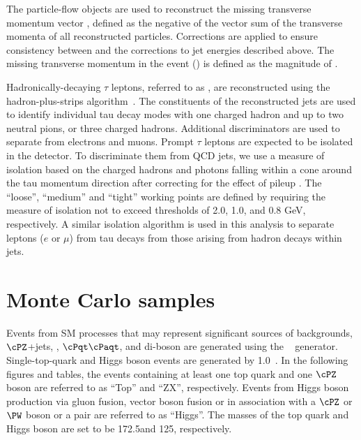 The particle-flow objects are used to reconstruct the missing transverse momentum  vector \ptvecmiss, defined as the negative of the vector sum of the transverse momenta of all reconstructed particles.  Corrections are applied to ensure consistency between
\ptvecmiss and the corrections to jet energies described above.  The missing transverse momentum in the event (\MPT) is defined as the magnitude of \ptvecmiss.

Hadronically-decaying $\tau$ leptons, referred to as \Tau, are reconstructed using the hadron-plus-strips algorithm~\cite{Khachatryan:2015dfa}.
The constituents of the reconstructed jets are used to identify individual tau decay modes with one charged 
hadron and up to two neutral pions, or three charged hadrons. 
Additional discriminators are used to separate \Tau from electrons and muons.
Prompt $\tau$ leptons are expected to be isolated in the detector.
To discriminate them from QCD jets, we use a measure of isolation 
based on the charged hadrons and photons falling within 
a cone around the tau momentum direction after correcting for the effect of
pileup \cite{Khachatryan:2014wca}. The ``loose'', ``medium'' and ``tight'' working points are defined
by requiring the measure of isolation not to exceed thresholds of 2.0, 1.0,
and 0.8 GeV, respectively.
 A similar isolation algorithm is 
used in this analysis to separate leptons ($e$ or $\mu$) from tau decays from 
those arising from hadron decays within jets.

\section{Monte Carlo samples}
\label{sect:MCSamples}
Events from SM processes that may represent significant sources of backgrounds, $\cPZ$+jets, \wjets, $\cPqt\cPaqt$, and di-boson 
are generated using the ~\cite{Alwall:2011uj} generator. 
Single-top-quark and Higgs boson events are generated by {\POWHEG} 1.0~\cite{Nason:2004rx,Frixione:2007vw,Alioli:2009je,Alioli:2010xd}.
In the following figures and tables, the events containing at least one top quark and one $\cPZ$ boson are referred to as ``Top'' and ``ZX'', respectively. 
Events from Higgs boson production via gluon fusion, vector boson fusion or in association with a $\cPZ$ or $\PW$ boson or a \ttbar pair are referred to as ``Higgs''. The masses of the top quark and Higgs boson are set to be 172.5\GeV and 125\GeV, respectively.

